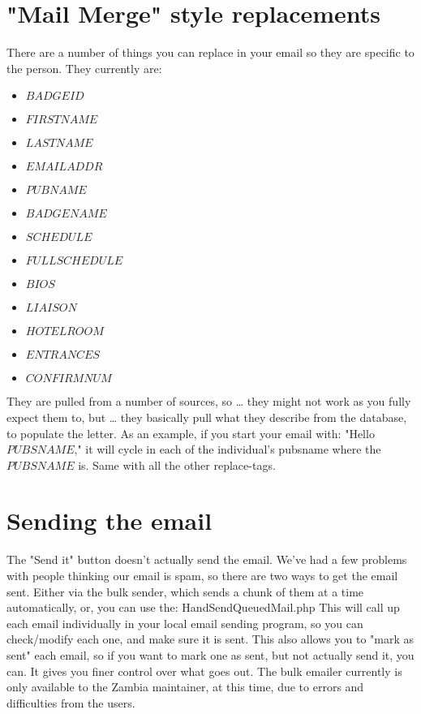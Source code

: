\documentclass[captions=tablesignature]{scrartcl}
\begin{document}
\section{"Mail Merge" style replacements}
\label{sec-6}
There are a number of things you can replace in your email so they
are specific to the person.  They currently are:
\begin{itemize}
\item $BADGEID$
\item $FIRSTNAME$
\item $LASTNAME$
\item $EMAILADDR$
\item $PUBNAME$
\item $BADGENAME$
\item $SCHEDULE$
\item $FULLSCHEDULE$
\item $BIOS$
\item $LIAISON$
\item $HOTELROOM$
\item $ENTRANCES$
\item $CONFIRMNUM$
\end{itemize}
They are pulled from a number of sources, so \ldots{} they might not work
as you fully expect them to, but \ldots{} they basically pull what they
describe from the database, to populate the letter.
As an example, if you start your email with:
"Hello $PUBSNAME$," it will cycle in each of the individual's
pubsname where the $PUBSNAME$ is.  Same with all the other
replace-tags.

\section{Sending the email}
\label{sec-7}
The "Send it" button doesn't actually send the email.  We've had a
few problems with people thinking our email is spam, so there are
two ways to get the email sent.  Either via the bulk sender, which
sends a chunk of them at a time automatically, or, you can use the:
HandSendQueuedMail.php
This will call up each email individually in your local email
sending program, so you can check/modify each one, and make sure it
is sent.  This also allows you to "mark as sent" each email, so if
you want to mark one as sent, but not actually send it, you can.  It
gives you finer control over what goes out.
The bulk emailer currently is only available to the Zambia
maintainer, at this time, due to errors and difficulties from the
users.
\end{document}
